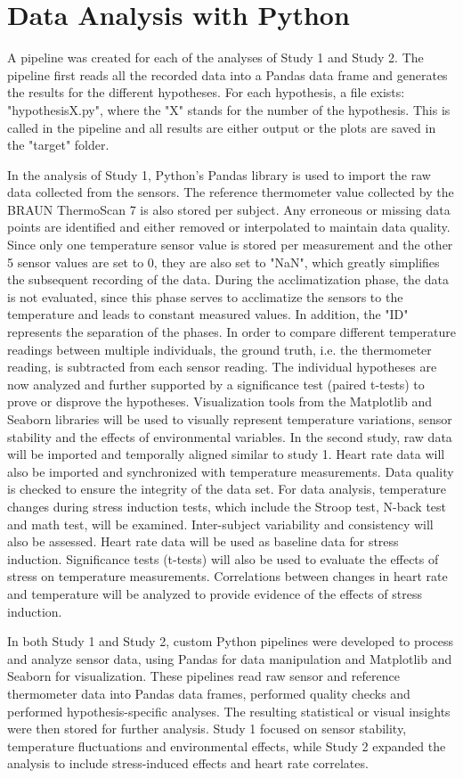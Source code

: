 \section{Data Analysis with Python}
A pipeline was created for each of the analyses of Study 1 and Study 2. 
The pipeline first reads all the recorded data into a Pandas data frame and generates the results for the different hypotheses.
For each hypothesis, a file exists: "hypothesisX.py", where the "X" stands for the number of the hypothesis. 
This is called in the pipeline and all results are either output or the plots are saved in the "target" folder.

In the analysis of Study 1, Python's Pandas library is used to import the raw data collected from the sensors. 
The reference thermometer value collected by the BRAUN ThermoScan 7 is also stored per subject. 
Any erroneous or missing data points are identified and either removed or interpolated to maintain data quality. 
Since only one temperature sensor value is stored per measurement and the other 5 sensor values are set to 0, they are also set to "NaN", which greatly simplifies the subsequent recording of the data.
During the acclimatization phase, the data is not evaluated, since this phase serves to acclimatize the sensors to the temperature and leads to constant measured values.
In addition, the "ID" represents the separation of the phases.
In order to compare different temperature readings between multiple individuals, the ground truth, i.e. the thermometer reading, is subtracted from each sensor reading.
The individual hypotheses are now analyzed and further supported by a significance test (paired t-tests) to prove or disprove the hypotheses.
Visualization tools from the Matplotlib and Seaborn libraries will be used to visually represent temperature variations, sensor stability and the effects of environmental variables.
In the second study, raw data will be imported and temporally aligned similar to study 1. Heart rate data will also be imported and synchronized with temperature measurements. 
Data quality is checked to ensure the integrity of the data set.
For data analysis, temperature changes during stress induction tests, which include the Stroop test, N-back test and math test, will be examined. 
Inter-subject variability and consistency will also be assessed. 
Heart rate data will be used as baseline data for stress induction. 
Significance tests (t-tests) will also be used to evaluate the effects of stress on temperature measurements. 
Correlations between changes in heart rate and temperature will be analyzed to provide evidence of the effects of stress induction. 

In both Study 1 and Study 2, custom Python pipelines were developed to process and analyze sensor data, using Pandas for data manipulation and Matplotlib and Seaborn for visualization. These pipelines read raw sensor and reference thermometer data into Pandas data frames, performed quality checks and performed hypothesis-specific analyses. The resulting statistical or visual insights were then stored for further analysis. Study 1 focused on sensor stability, temperature fluctuations and environmental effects, while Study 2 expanded the analysis to include stress-induced effects and heart rate correlates.